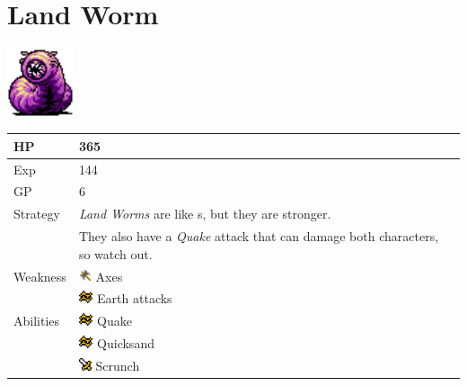 \section{Land Worm}
\label{monster:land_worm}

\includegraphics[height=2cm,keepaspectratio]{./resources/monster/land_worm}

\begin{longtable}{ l p{9cm} }
	HP
	& 365
\\ \hline
	Exp
	& 144
\\ \hline
	GP
	& 6
\\ \hline
	Strategy
	& \textit{Land Worms} are like \nameref{monster:sand_worm}s, but they are stronger. \\
	& They also have a \textit{Quake} attack that can damage both characters, so watch out.
\\ \hline
	Weakness
	& \includegraphics[height=1em,keepaspectratio]{./resources/effects/axe} Axes \\
	& \includegraphics[height=1em,keepaspectratio]{./resources/effects/earth} Earth attacks
\\ \hline
	Abilities
	& \includegraphics[height=1em,keepaspectratio]{./resources/effects/earth} Quake \\
	& \includegraphics[height=1em,keepaspectratio]{./resources/effects/earth} Quicksand \\
	& \includegraphics[height=1em,keepaspectratio]{./resources/effects/damage} Scrunch
\end{longtable}
